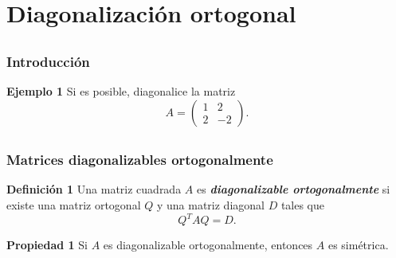 \section{Diagonalización ortogonal}

\subsection{}

\begin{frame}\frametitle{Introducción}
	
	\begin{ej}{\textbf{Ejemplo 1}}
		Si es posible, diagonalice la matriz 
		\[
		A =
		\left(
		\begin{array}{rr}
		1 & 2 \\[1mm]
		2 & -2
		\end{array}
		\right).
		\]	
	\end{ej}
	
\end{frame}


\subsection{}

\begin{frame}\frametitle{Matrices diagonalizables ortogonalmente}
	
	\begin{defi}{\textbf{Definición 1}}\justifying
		\justifying
		Una matriz cuadrada $A$ es \textbf{\textit{diagonalizable ortogonalmente}} si existe una matriz 
		ortogonal $Q$ y una matriz diagonal $D$ tales que
		\[
		Q^TAQ = D.
		\]
	\end{defi}	
	
	\begin{prop}{\textbf{Propiedad 1}}
		\justifying
		Si $A$ es diagonalizable ortogonalmente, entonces $A$ es simétrica.
	\end{prop}	
	
\end{frame}


\subsection{}

